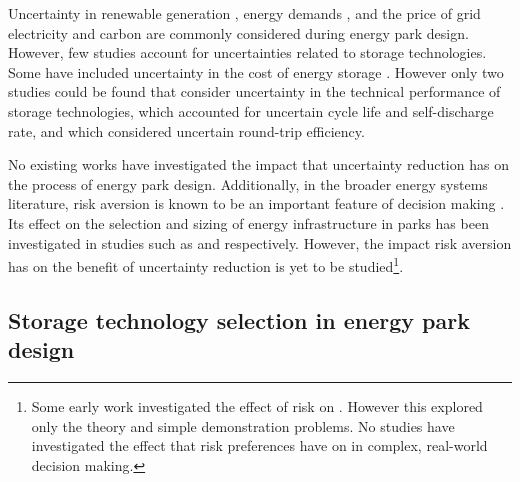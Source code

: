 Uncertainty in renewable generation \citep{kim2024MultiperiodMultitimescaleStochastic,gabrielli2019RobustOptimalDesign}, energy demands \citep{maia2021CertaintyUncertaintyStochastic,keyvandarian2023OptimalSizingReliabilityconstrained}, and the price of grid electricity \citep{bakke2016InvestmentElectricEnergy,mohammadi2022EffectMultiUncertainties} and carbon \citep{yang2024PlanningMicrogridsIndustrial} are commonly considered during energy park design.
However, few studies account for uncertainties related to storage technologies. Some have included uncertainty in the cost of energy storage \citep{kim2024MultiperiodMultitimescaleStochastic,bakke2016InvestmentElectricEnergy,chadly2023TechnoeconomicAssessmentEnergy,coppitters2021RobustDesignOptimization}.
However only two studies could be found that consider uncertainty in the technical performance of storage technologies, \citep{coppitters2021RobustDesignOptimization} which accounted for uncertain cycle life and self-discharge rate, and \citep{chadly2023TechnoeconomicAssessmentEnergy} which considered uncertain round-trip efficiency.

No existing works have investigated the impact that uncertainty reduction has on the process of energy park design.
Additionally, in the broader energy systems literature, risk aversion is known to be an important feature of decision making \citep{pickering2019PracticalOptimisationDistrict,mu2022CVaRbasedRiskAssessment,tostado-veliz2024RiskaverseElectrolyserSizing}. Its effect on the selection and sizing of energy infrastructure in parks has been investigated in studies such as \citep{mu2022CVaRbasedRiskAssessment} and \citep{tostado-veliz2024RiskaverseElectrolyserSizing} respectively.
However, the impact risk aversion has on the benefit of uncertainty reduction is yet to be studied\footnote{Some early work investigated the effect of risk on  \citep{gould1974RiskStochasticPreference}. However this explored only the theory and simple demonstration problems. No studies have investigated the effect that risk preferences have on  in complex, real-world decision making.}.


\newpage
\subsection{Storage technology selection in energy park design}

